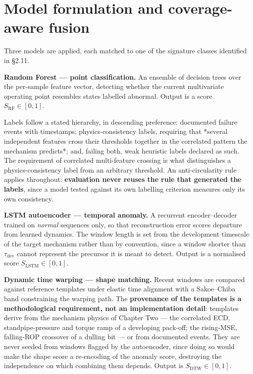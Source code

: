 \documentclass[12pt,a4paper]{report}
\begin{document}
\section{Model formulation and coverage-aware fusion}

Three models are applied, each matched to one of the signature classes identified in §2.11.

\textbf{Random Forest --- point classification.} An ensemble of decision trees over the per-sample feature
vector, detecting whether the current multivariate operating point resembles states labelled abnormal.
Output is a score $S_{\text{RF}} \in [0,1]$.

Labels follow a stated hierarchy, in descending preference: documented failure events with timestamps;
physics-consistency labels, requiring that *several independent features cross their thresholds together in
the correlated pattern the mechanism predicts*; and, failing both, weak heuristic labels declared as such.
The requirement of correlated multi-feature crossing is what distinguishes a physics-consistency label from
an arbitrary threshold. An anti-circularity rule applies throughout: \textbf{evaluation never reuses the rule
that generated the labels}, since a model tested against its own labelling criterion measures only its
own consistency.

\textbf{LSTM autoencoder --- temporal anomaly.} A recurrent encoder--decoder trained on \emph{normal} sequences only,
so that reconstruction error scores departure from learned dynamics. The window length is set from the
development timescale of the target mechanism rather than by convention, since a window shorter than
$\tau_{\text{dev}}$ cannot represent the precursor it is meant to detect. Output is a normalised score
$S_{\text{LSTM}} \in [0,1]$.

\textbf{Dynamic time warping --- shape matching.} Recent windows are compared against reference templates under
elastic time alignment with a Sakoe--Chiba band constraining the warping path. The \textbf{provenance of the
templates is a methodological requirement, not an implementation detail}: templates derive from the
mechanism physics of Chapter Two --- the correlated ECD, standpipe-pressure and torque ramp of a developing
pack-off; the rising-MSE, falling-ROP crossover of a dulling bit --- or from documented events. They are
never seeded from windows flagged by the autoencoder, since doing so would make the shape score a
re-encoding of the anomaly score, destroying the independence on which combining them depends. Output is
$S_{\text{DTW}} \in [0,1]$.
\end{document}
